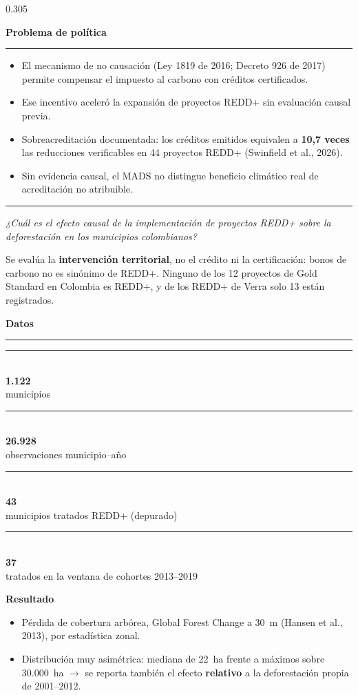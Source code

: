 \documentclass[final,t]{beamer}
\newcommand{\seccion}[2]{%
  \par\vspace{0.5\baselineskip}%
  {\color{dosel}\Large\bfseries #1\hfill{\color{tenue}\normalsize\mdseries #2}}\par
  \vspace{-0.35\baselineskip}%
  {\color{dosel}\rule{\linewidth}{2.2pt}}\par
  \vspace{0.25\baselineskip}%
}
\newcommand{\nota}[1]{{\color{tenue}\small #1\par}}
\newcommand{\cifra}[2]{%
  \parbox[t]{0.46\linewidth}{%
    {\color{tinta}\rule{\linewidth}{2.5pt}}\\[0.25\baselineskip]
    {\color{dosel}\fontsize{50}{52}\selectfont\bfseries #1}\\[0.2\baselineskip]
    {\color{tenue}\small #2}}%
}
\begin{document}
\begin{frame}[t]{}
\begin{columns}[t]

\begin{column}{0.305\paperwidth}
\justifying

\seccion{Problema de política}{}
\begin{itemize}
  \item El mecanismo de no causación (Ley 1819 de 2016; Decreto 926 de 2017) permite compensar
        el impuesto al carbono con créditos certificados.
  \item Ese incentivo aceleró la expansión de proyectos REDD+ sin evaluación causal previa.
  \item[\textcolor{brasa}{\rule{0.45ex}{0.45ex}}] Sobreacreditación documentada: los créditos emitidos
        equivalen a \textbf{10,7 veces} las reducciones verificables en 44 proyectos REDD+
        (Swinfield et al., 2026).
  \item Sin evidencia causal, el MADS no distingue beneficio climático real de acreditación
        no atribuible.
\end{itemize}

\vspace{0.3cm}
{\color{amazonia}\rule{3pt}{2.6cm}}\hspace{0.4cm}%
\begin{minipage}[b]{0.88\linewidth}
  {\color{dosel}\fontsize{30}{36}\selectfont\itshape
   ¿Cuál es el efecto causal de la implementación de proyectos REDD+ sobre la
   deforestación en los municipios colombianos?}
\end{minipage}

\vspace{0.3cm}
\nota{Se evalúa la \textbf{intervención territorial}, no el crédito ni la certificación: bonos de
carbono no es sinónimo de REDD+. Ninguno de los 12 proyectos de Gold Standard en Colombia es
REDD+, y de los REDD+ de Verra solo 13 están registrados.}

\seccion{Datos}{}
\cifra{1.122}{municipios}\hfill\cifra{26.928}{observaciones municipio--año}

\vspace{0.5cm}
\cifra{43}{municipios tratados REDD+ (depurado)}\hfill\cifra{37}{tratados en la ventana de cohortes 2013--2019}

\vspace{0.3cm}
\textbf{\large Resultado}
\begin{itemize}
  \item Pérdida de cobertura arbórea, Global Forest Change a 30~m (Hansen et al., 2013),
        por estadística zonal.
  \item Distribución muy asimétrica: mediana de 22~ha frente a máximos sobre 30.000~ha
        $\rightarrow$ se reporta también el efecto \textbf{relativo} a la deforestación
        propia de 2001--2012.
\end{itemize}


\end{column}
\end{columns}
\end{frame}
\end{document}
